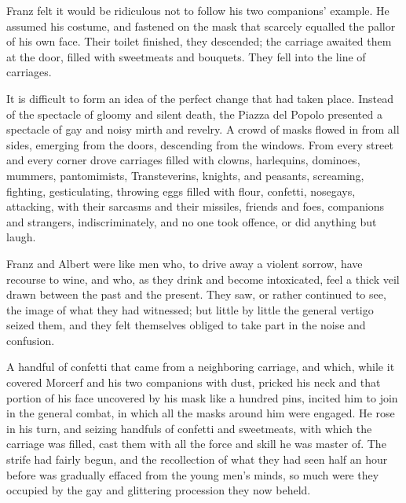  Franz felt it would be ridiculous not to follow his two companions' example. He assumed his costume, and fastened on the mask that scarcely equalled the pallor of his own face. Their toilet finished, they descended; the carriage awaited them at the door, filled with sweetmeats and bouquets. They fell into the line of carriages. 

 It is difficult to form an idea of the perfect change that had taken place. Instead of the spectacle of gloomy and silent death, the Piazza del Popolo presented a spectacle of gay and noisy mirth and revelry. A crowd of masks flowed in from all sides, emerging from the doors, descending from the windows. From every street and every corner drove carriages filled with clowns, harlequins, dominoes, mummers, pantomimists, Transteverins, knights, and peasants, screaming, fighting, gesticulating, throwing eggs filled with flour, confetti, nosegays, attacking, with their sarcasms and their missiles, friends and foes, companions and strangers, indiscriminately, and no one took offence, or did anything but laugh. 

 Franz and Albert were like men who, to drive away a violent sorrow, have recourse to wine, and who, as they drink and become intoxicated, feel a thick veil drawn between the past and the present. They saw, or rather continued to see, the image of what they had witnessed; but little by little the general vertigo seized them, and they felt themselves obliged to take part in the noise and confusion. 

 A handful of confetti that came from a neighboring carriage, and which, while it covered Morcerf and his two companions with dust, pricked his neck and that portion of his face uncovered by his mask like a hundred pins, incited him to join in the general combat, in which all the masks around him were engaged. He rose in his turn, and seizing handfuls of confetti and sweetmeats, with which the carriage was filled, cast them with all the force and skill he was master of.  The strife had fairly begun, and the recollection of what they had seen half an hour before was gradually effaced from the young men's minds, so much were they occupied by the gay and glittering procession they now beheld. 

